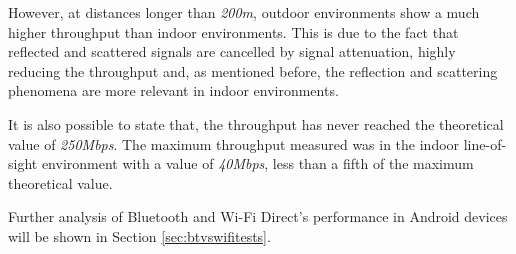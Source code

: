 However, at distances longer than \textit{200m}, outdoor environments show a much higher throughput than indoor environments. This is due to the fact that reflected and scattered signals are cancelled by signal attenuation, highly reducing the throughput and, as mentioned before, the reflection and scattering phenomena are more relevant in indoor environments.

It is also possible to state that, the throughput has never reached the theoretical value of \textit{250Mbps}. The maximum throughput measured was in the indoor line-of-sight environment with a value of \textit{40Mbps}, less than a fifth of the maximum theoretical value.

Further analysis of Bluetooth and Wi-Fi Direct's performance in Android devices will be shown in Section \ref{sec:btvswifitests}.